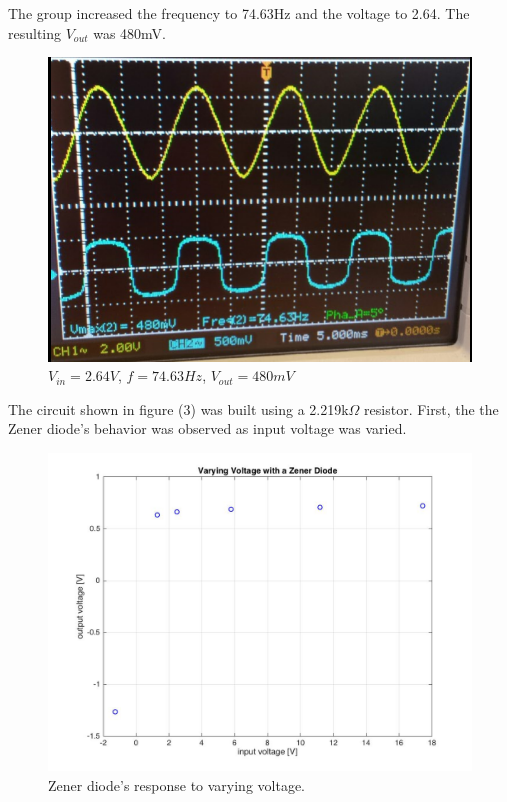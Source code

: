 \documentclass[twocolumn, amsmath]{revtex4}
\begin{document}



The group increased the frequency to 74.63Hz and the voltage to 2.64. The resulting $V_{out}$ was 480mV.

\begin{figure}[h]
    \includegraphics[scale=0.4]{480mV.png}  
    \caption{$V_{in} = 2.64V$, $f=74.63Hz$, $V_{out}= 480mV$}
\end{figure}

The circuit shown in figure (3) was built using a 2.219k$\Omega$ resistor. First, the the Zener diode's behavior was observed as input voltage was varied.
\begin{figure}[h]
    \includegraphics[scale=0.2]{zenerdiode_plot}  
    \caption{Zener diode's response to varying voltage.}
\end{figure}
\end{document}
